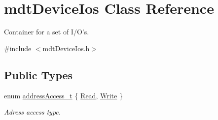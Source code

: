 \hypertarget{classmdt_device_ios}{
\section{mdtDeviceIos Class Reference}
\label{classmdt_device_ios}
}


Container for a set of I/O's.  




{\ttfamily \#include $<$mdtDeviceIos.h$>$}

\subsection*{Public Types}
\begin{DoxyCompactItemize}
\item 
enum \hyperlink{classmdt_device_ios_a72fc3fdcd905d669b1e90496e808d6dd}{addressAccess\_\-t} \{ \hyperlink{classmdt_device_ios_a72fc3fdcd905d669b1e90496e808d6dda69811abe027fb5c9c22cf99034ef626b}{Read}, 
\hyperlink{classmdt_device_ios_a72fc3fdcd905d669b1e90496e808d6dda29a5b11f060f7fce671b9ced4bb4ef7a}{Write}
 \}
\begin{DoxyCompactList}\small\item\em Adress access type. \end{DoxyCompactList}\end{DoxyCompactItemize}
